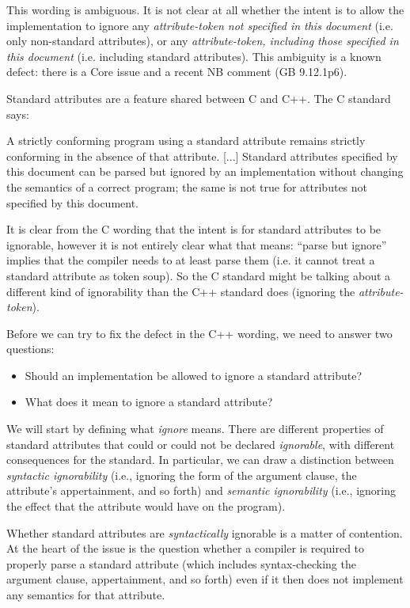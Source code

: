 This wording is ambiguous. It is not clear at all whether the intent is to allow the implementation to ignore any  \emph{attribute-token not specified in this document} (i.e. only non-standard attributes), or any  \emph{attribute-token, including those specified in this document} (i.e. including standard attributes). This ambiguity is a known defect: there is a Core issue \cite{CWG2538} and a recent NB comment (GB 9.12.1p6).

Standard attributes are a feature shared between C and C++. The C standard says:

\begin{adjustwidth}{0.5cm}{0.5cm}
A strictly conforming program using a standard attribute remains
strictly conforming in the absence of that attribute. [...] Standard attributes specified by this document can be parsed but ignored by an implementation without changing the semantics of a correct program; the same is not true for attributes not specified by this document.
\end{adjustwidth}

It is clear from the C wording that the intent is for standard attributes to be ignorable, however it is not entirely clear what that means: ``parse but ignore'' implies that the compiler needs to at least parse them (i.e. it cannot treat a standard attribute as token soup). So the C standard might be talking about a different kind of ignorability than the C++ standard does (ignoring the \emph{attribute-token}).

Before we can try to fix the defect in the C++ wording, we need to answer two questions:

\begin{itemize}
\item Should an implementation be allowed to ignore a standard attribute?
\item What does it mean to ignore a standard attribute?
\end{itemize}

We will start by defining what \emph{ignore} means. There are different properties of standard attributes that could or could not be declared \emph{ignorable}, with different consequences for the standard. In particular, we can draw a distinction between \emph{syntactic ignorability} (i.e., ignoring the form of the argument clause, the attribute's appertainment, and so forth) and \emph{semantic ignorability} (i.e., ignoring the effect that the attribute would have on the program).

Whether standard attributes are \emph{syntactically} ignorable is a matter of contention. At the heart of the issue is the question whether a compiler is required to properly parse a standard attribute (which includes syntax-checking the argument clause, appertainment, and so forth) even if it then does not implement any semantics for that attribute.

